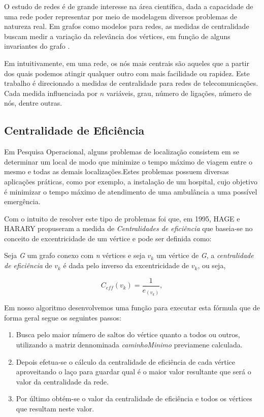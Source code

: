 \documentclass[12pt]{article}
\begin{document}
O estudo de redes é de grande interesse na área científica, dada a capacidade de uma rede poder representar por meio de modelagem diversos problemas de natureza real.
Em grafos como modelos para redes, as medidas de centralidade buscam medir a variação da relevância dos vértices, em função de alguns invariantes do grafo \cite{freitas}.

Em \cite{freitas} intuitivamente, em uma rede, os nós mais centrais são aqueles que a partir dos quais podemos atingir qualquer outro com mais facilidade ou rapidez.
Este trabalho é direcionado a medidas de centralidade para redes de telecomunicações.
Cada medida influenciada por $n$ variáveis, grau, número de ligações, número de nós, dentre outras.

\subsection{Centralidade de Eficiência}
Em  Pesquisa  Operacional,  alguns  problemas  de  localização  consistem  em  se determinar um local de modo que minimize o tempo máximo de viagem entre o mesmo e todas as demais localizações.Estes problemas possuem diversas aplicações práticas, como  por  exemplo,  a  instalação  de  um  hospital,  cujo objetivo  é  minimizar  o  tempo máximo de atendimento de uma ambulância a uma possível emergência\cite{freitas}.

Com o intuito de resolver este tipo de problemas foi que, em 1995,  HAGE e HARARY propuseram a medida de {\it Centralidades de eficiência} que baseia-se no conceito de excentricidade de um vértice e pode ser definida como: 

Seja  {\it G} um grafo conexo com {\it n} vértices  e seja $v_k$ um vértice de {\it G}, a {\it centralidade de eficiência} de $v_k$ é dada pelo inverso da excentricidade de $v_k$, ou seja,
\begin{center}
\begin{equation}
C_{eff}(v_k)= \frac{1}{e_{(v_k)}},
\end{equation}
\end{center}
Em nosso algoritmo desenvolvemos uma função para executar esta fórmula que de forma geral segue os seguintes passos:
\begin{enumerate}
\item Busca pelo maior número de saltos do vértice quanto a todos ou outros, utilizando a matriz dennominada {\it caminhoMinimo} previamene calculada.
\item Depois efetua-se o cálculo da centralidade de eficiência de cada vértice aproveitando o laço para guardar qual é o maior valor resultante que será o valor da centralidade da rede.
\item Por último obtém-se o valor da centralidade de eficiência e todos os vértices que resultam neste valor. 
\end{enumerate} 
   
\end{document}
